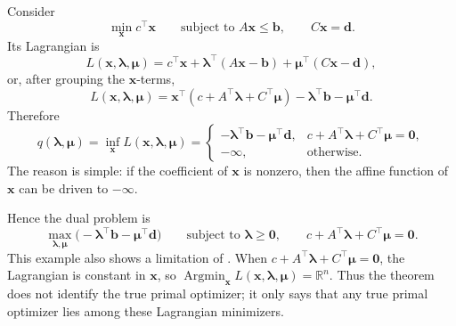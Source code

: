 \begin{example}
\label{ex:ch8-dual-lp}
Consider
\[
  \min_{\mathbf{x}} c^\top \mathbf{x}
  \qquad
  \text{subject to }
  A\mathbf{x}\le \mathbf{b},
  \qquad
  C\mathbf{x}=\mathbf{d}.
\]
Its Lagrangian is
\[
  L(\mathbf{x},\boldsymbol{\lambda},\boldsymbol{\mu})
  =
  c^\top \mathbf{x}
  + \boldsymbol{\lambda}^\top(A\mathbf{x}-\mathbf{b})
  + \boldsymbol{\mu}^\top(C\mathbf{x}-\mathbf{d}),
\]
or, after grouping the $\mathbf{x}$-terms,
\[
  L(\mathbf{x},\boldsymbol{\lambda},\boldsymbol{\mu})
  =
  \mathbf{x}^\top
  (c + A^\top \boldsymbol{\lambda} + C^\top \boldsymbol{\mu})
  - \boldsymbol{\lambda}^\top \mathbf{b}
  - \boldsymbol{\mu}^\top \mathbf{d}.
\]
Therefore
\[
  q(\boldsymbol{\lambda},\boldsymbol{\mu})
  =
  \inf_{\mathbf{x}} L(\mathbf{x},\boldsymbol{\lambda},\boldsymbol{\mu})
  =
  \begin{cases}
    -\boldsymbol{\lambda}^\top \mathbf{b}
    - \boldsymbol{\mu}^\top \mathbf{d},
    &
    c + A^\top \boldsymbol{\lambda} + C^\top \boldsymbol{\mu}
    = \mathbf{0},
    \\
    -\infty, & \text{otherwise}.
  \end{cases}
\]
The reason is simple: if the coefficient of $\mathbf{x}$ is nonzero, then the
affine function of $\mathbf{x}$ can be driven to $-\infty$.

Hence the dual problem is
\[
  \max_{\boldsymbol{\lambda},\boldsymbol{\mu}}
  \bigl(
    -\boldsymbol{\lambda}^\top \mathbf{b}
    - \boldsymbol{\mu}^\top \mathbf{d}
  \bigr)
  \qquad
  \text{subject to }
  \boldsymbol{\lambda}\ge \mathbf{0},
  \qquad
  c + A^\top \boldsymbol{\lambda} + C^\top \boldsymbol{\mu}=\mathbf{0}.
\]
This example also shows a limitation of . When
$c + A^\top \boldsymbol{\lambda} + C^\top \boldsymbol{\mu}= \mathbf{0}$, the
Lagrangian is constant in $\mathbf{x}$, so
$\operatorname*{Argmin}_{\mathbf{x}}
L(\mathbf{x},\boldsymbol{\lambda},\boldsymbol{\mu})
=\mathbb{R}^n$. Thus the theorem does not identify the true primal optimizer;
it only says that any true primal optimizer lies among these Lagrangian
minimizers.
\end{example}

